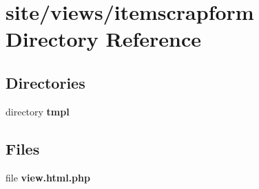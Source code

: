 \section{site/views/itemscrapform Directory Reference}
\label{dir_82dff61225adf5bb713e1eda66604203}
\subsection*{Directories}
\begin{DoxyCompactItemize}
\item 
directory \textbf{ tmpl}
\end{DoxyCompactItemize}
\subsection*{Files}
\begin{DoxyCompactItemize}
\item 
file \textbf{ view.\+html.\+php}
\end{DoxyCompactItemize}
